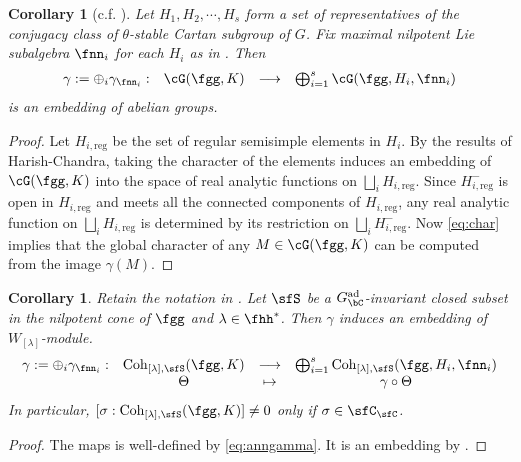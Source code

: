 \documentclass[12pt,a4paper]{amsart}
\numberwithin{equation}{section}
\newtheorem{cor}[thm]{Corollary}
\theoremstyle{remark}
\def\Gcad{G_\bC^{\text{ad}}}
\def\Wlam{W_{[\lambda]}}
\def\Coh{\mathrm{Coh}}
\def\Hireg{H_{i,\text{reg}}}
\def\Hnireg{H^-_{i,\text{reg}}}
\begin{document}
\begin{cor}[c.f. {\cite{Mc}}]\label{cor:HC.embed}
  Let $H_{1}, H_{2}, \cdots, H_{s}$ form a set of representatives of the
  conjugacy class of $\theta$-stable Cartan subgroup of $G$. Fix maximal
  nilpotent Lie subalgebra $\fnn_{i}$ for each $H_{i}$ as in
  . Then
  \[
    \begin{array}{cccc}
      \gamma:=\oplus_{i} \gamma_{\fnn_{i}}: &\Grt(\fgg,K)
      &\longrightarrow & \bigoplus_{i=1}^{s} \Grt(\fgg,H_{i},\fnn_{i})\\
    \end{array}
  \]
  is an embedding of abelian groups.
\end{cor}
\begin{proof}
  Let $\Hireg$ be the set of regular semisimple elements in $H_{i}$. By the
  results of Harish-Chandra, taking the character of the elements induces an
  embedding of $\Grt(\fgg,K)$ into the space of real analytic functions on
  $\bigsqcup_{i} \Hireg$. Since $\Hnireg$ is open in $\Hireg$ and meets all the
  connected components of $\Hireg$, any real analytic function on
  $\bigsqcup_{i} \Hireg$ is determined by its restriction on
  $\bigsqcup_{i} \Hnireg$. Now \eqref{eq:char} implies that the global character
  of any $M\in \Grt(\fgg,K)$ can be computed from the image $\gamma(M)$.
\end{proof}

\begin{cor}\label{cor:coh.HC}
  Retain the notation in .
  Let $\sfS$ be a $\Gcad$-invariant closed subset in the nilpotent cone of
  $\fgg$ and $\lambda\in \fhh^{*}$.
  Then $\gamma$ induces an embedding of $\Wlam$-module.
  \[
    \begin{array}{cccc}
      \gamma:=\oplus_{i} \gamma_{\fnn_{i}}: &\Coh_{[\lambda],\sfS}(\fgg,K)
      &\longrightarrow & \bigoplus_{i=1}^{s} \Coh_{[\lambda],\sfS}(\fgg,H_{i},\fnn_{i})\\
      &\Theta& \mapsto &\gamma\circ \Theta
    \end{array}
  \]
  In particular, $[\sigma:\Coh_{[\lambda],\sfS}(\fgg,K)]\neq 0$ only if
  $\sigma\in \sfC_{\sfC}$.
\end{cor}
\begin{proof}
  The maps is well-defined by \eqref{eq:anngamma}. It is an embedding by
  .
\end{proof}
\end{document}
